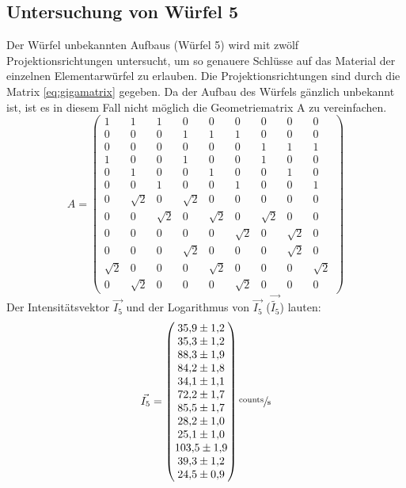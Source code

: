 \subsection{Untersuchung von Würfel 5}
Der Würfel unbekannten Aufbaus (Würfel 5) wird mit zwölf Projektionsrichtungen untersucht, um so genauere Schlüsse auf das Material der einzelnen Elementarwürfel zu erlauben.
Die Projektionsrichtungen sind durch die Matrix \ref{eq:gigamatrix} gegeben.
Da der Aufbau des Würfels gänzlich unbekannt ist, ist es in diesem Fall nicht möglich die Geometriematrix A zu vereinfachen.
\begin{equation}
	A=
	\begin{pmatrix}
    1& 1& 1& 0& 0& 0& 0& 0& 0\\
    0& 0& 0& 1& 1& 1& 0& 0& 0\\
    0 & 0& 0& 0& 0& 0& 1& 1& 1\\
    1& 0& 0& 1& 0& 0& 1& 0& 0\\
    0& 1& 0& 0& 1& 0& 0& 1& 0\\
    0& 0& 1& 0& 0& 1& 0& 0& 1\\
    0& \sqrt{2}& 0& \sqrt{2}& 0& 0& 0& 0& 0\\
    0& 0& \sqrt{2}& 0&\sqrt{2}& 0& \sqrt{2}& 0& 0\\
    0& 0& 0& 0& 0&\sqrt{2}& 0& \sqrt{2}& 0\\
    0& 0& 0&\sqrt{2}& 0& 0& 0&\sqrt{2}& 0\\
    \sqrt{2}& 0& 0& 0& \sqrt{2}& 0& 0& 0& \sqrt{2}\\
    0& \sqrt{2}& 0& 0& 0& \sqrt{2}& 0& 0& 0
	\end{pmatrix}
  \label{eq:gigamatrix}
\end{equation}
Der Intensitätsvektor $\vec{I_5}$ und der Logarithmus von $\vec{I_5}$ ($\vec{\tilde{I_5}}$) lauten:
\begin{equation}
	\vec{I_5}=
	\begin{pmatrix}
		\num{35.9 \pm 1.2} \\
		\num{35.3 \pm 1.2} \\
		\num{88.3\pm 1.9} \\
		\num{84.2\pm 1.8} \\
		\num{34.1\pm 1.1} \\
		\num{72.2\pm 1.7} \\
		\num{85.5\pm 1.7} \\
		\num{28.2\pm 1.0} \\
		\num{25.1\pm 1.0} \\
    \num{103.5\pm 1.9} \\
    \num{39.3\pm 1.2} \\
    \num{24.5\pm 0.9} \\
	\end{pmatrix}
    \sfrac{\text{counts}}{\text{s}}
	\label{eq:vec5}
\end{equation}
